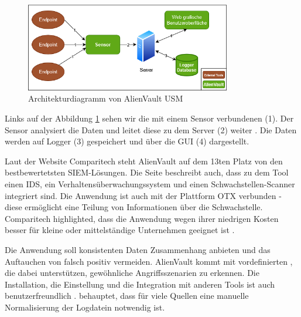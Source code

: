 \begin{figure}[H]
   \centering
   \includegraphics[width=0.8\textwidth]{assets/AlienVault.drawio.png}
   \caption[Architekturdiagramm von AlienVault \gls{USM}]
   {Architekturdiagramm von AlienVault \gls{USM}}
   \label{fig:AlienVault_Architektur}
   \centering
\end{figure}



Links auf der Abbildung \ref{fig:AlienVault_Architektur} sehen wir die mit einem Sensor verbundenen  (1). Der Sensor analysiert die Daten und leitet diese zu dem Server (2) weiter \citep{AV_Sensor}. Die Daten werden auf Logger (3) gespeichert und über die \gls{GUI} (4) dargestellt.

Laut der Website Comparitech steht AlienVault auf dem 13ten Platz von den bestbewertetsten \gls{SIEM}-Lösungen. Die Seite beschreibt auch, dass zu dem Tool einen \gls{IDS}, ein Verhaltensüberwachungssystem und einen Schwachstellen-Scanner integriert sind. Die Anwendung ist auch mit der Plattform \gls{OTX} verbunden - diese ermöglicht eine Teilung von Informationen über die Schwachstelle. Comparitech highlighted, dass die Anwendung wegen ihrer niedrigen Kosten besser für kleine oder mittelständige Unternehmen geeignet ist \citep{comparitech_SIEM}.

Die Anwendung soll konsistenten Daten Zusammenhang anbieten und das Auftauchen von \gls{falsch positiv} vermeiden. AlienVault kommt mit vordefinierten , die dabei unterstützen, gewöhnliche Angriffsszenarien zu erkennen. Die Installation, die Einstellung und die Integration mit anderen Tools ist auch benutzerfreundlich \citep{Gomes_AV}. \cite{Nabil_AV} behauptet, dass für viele Quellen eine manuelle Normalisierung der Logdatein notwendig ist.

